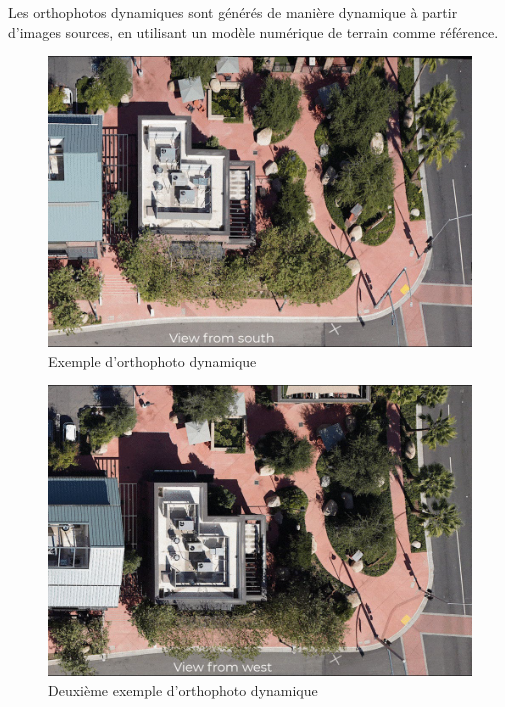 Les orthophotos dynamiques sont générés de manière dynamique à partir d'images sources, en utilisant un modèle numérique de terrain comme référence.
\begin{figure}[H]
    \centering
    \includegraphics[width=1\linewidth]{03-tail//A1_fondamentaux_ML//A1_figures/A1_10_ortophoto_dynamique1.png}
    \caption{Exemple d’orthophoto dynamique \cite{barrette_different_2022}}
    \label{fig:A1_10_ortophoto_dynamique1}
\end{figure}

\begin{figure}[H]
    \centering
    \includegraphics[width=1\linewidth]{03-tail//A1_fondamentaux_ML//A1_figures/A1_11_orthophoto_dynamique2.png}
    \caption{Deuxième exemple d’orthophoto dynamique \cite{barrette_different_2022}}
    \label{fig:A1_11_orthophoto_dynamique2}
\end{figure}

